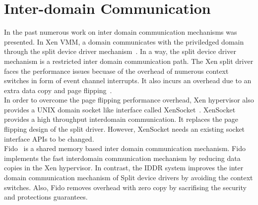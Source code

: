 \section{Inter-domain Communication}
\label{sec:interdomain}
In the past numerous work on inter domain communication mechanisms was presented. In Xen VMM, a domain communicates with the priviledged domain through the split device driver mechanism~\cite{Fraser04safehardware}. In a way, the split device driver mechanism is a restricted inter domain communication path. The Xen split driver faces the performance issues becuase of the overhead of numerous context switches in form of event channel interrupts. It also incurs an overhead due to an extra data copy and page flipping~\cite{Zhang:2007:XHI:1516124.1516138}. 
\\[3mm]
In order to overcome the page flipping performance overhead, Xen hypervisor also provides a UNIX domain socket like interface called XenSocket~\cite{Zhang:2007:XHI:1516124.1516138}. XenSocket provides a high throughput interdomain communication. It replaces the page flipping design of the split driver. However, XenSocket needs an existing socket interface APIs to be changed. 
\\[3mm]
Fido~\cite{Burtsev:2009:FFI:1855807.1855832} is a shared memory based inter domain communication mechanism. Fido implements the fast interdomain communication mechanism by reducing data copies in the Xen hypervisor. In contrast, the IDDR system improves the inter domain communication mechanism of Split device drivers by avoiding the context switches. Also, Fido removes overhead with zero copy by sacrifising the security and protections guarantees.
\\[3mm]

